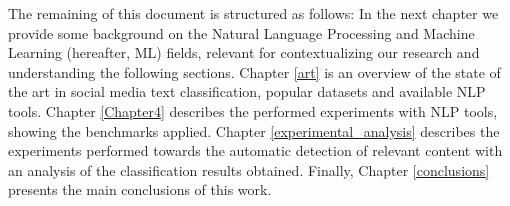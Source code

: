 The remaining of this document is structured as follows: In the next chapter we provide some background on the Natural Language Processing and Machine Learning (hereafter, ML) fields, relevant for contextualizing our research and understanding the following sections. Chapter \ref{art} is an overview of the state of the art in  social media text classification, popular datasets and available NLP tools. Chapter \ref{Chapter4} describes the performed experiments with NLP tools, showing the benchmarks applied. Chapter \ref{experimental_analysis} describes the experiments performed towards the automatic detection of relevant content with an  analysis of the classification results obtained. Finally, Chapter \ref{conclusions} presents the main conclusions of this work.

\begin{comment}



\end{comment}

